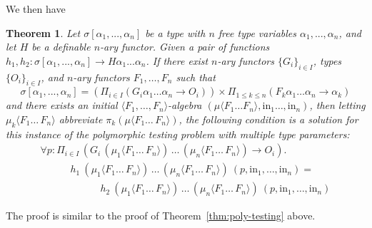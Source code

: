 \documentclass{article}[12 pt]
\newtheorem{thm}{Theorem}
\theoremstyle{problemstyle}
\begin{document}
We then have

\begin{thm}\label{thm:general}
Let $\sigma[\alpha_1,...,\alpha_n]$ be a type with $n$ free type
variables $\alpha_1,...,\alpha_n$, and let $H$ be a definable $n$-ary
functor. Given a pair of functions $h_1, h_2 :
\sigma[\alpha_1,...,\alpha_n] \to H \alpha_1...\alpha_n$. If there
exist $n$-ary functors $\{G_i\}_{i \in I}$, types $\{O_i\}_{i \in I}$,
and $n$-ary functors $F_1,\dots,F_n$ such that
\begin{displaymath}
  \sigma[\alpha_1,...,\alpha_n] = \left(\Pi_{i \in I} (G_i
  \alpha_1\dots\alpha_n \to O_i)\right) \times \Pi_{1 \leq k \leq
    n}(F_k \alpha_1\dots\alpha_n \to \alpha_k) 
\end{displaymath}
and there exists an initial $\langle F_1,\dots,F_n \rangle$-algebra
$(\mu \langle F_1 \dots F_n \rangle, \mathrm{in}_1 \dots,
\mathrm{in}_n)$, then letting $\mu_k \langle F_1 \dots\, F_n \rangle$
abbreviate $\pi_k (\mu \langle F_1 \dots\, F_n \rangle)$, the
following condition is a solution for this instance of the polymorphic
testing problem with multiple type parameters:
\begin{equation}
  \label{eq:solution-1}
  \begin{array}{l}
    \forall p : \Pi_{i \in I} \, (G_i\,(\mu_1 \langle F_1 \dots\, F_n
    \rangle)\, \dots \,(\mu_n \langle F_1 \dots\, F_n \rangle) \to
    O_i).\\ \quad \quad \quad h_1~(\mu_1 \langle F_1 \dots\, F_n
    \rangle)\, \dots \,(\mu_n \langle F_1 \dots\, F_n \rangle) ~(p,
    \mathrm{in}_1, \dots, \mathrm{in}_n)
    =\\ \quad\quad\quad\quad\quad\quad h_2~ (\mu_1 \langle F_1 \dots\,
    F_n \rangle)\, \dots \,(\mu_n \langle F_1 \dots\, F_n \rangle)~(p,
    \mathrm{in}_1, \dots, \mathrm{in}_n)
\end{array}
\end{equation}
\end{thm}
\noindent
The proof is similar to the proof of Theorem~\ref{thm:poly-testing}
above.
\end{document}
